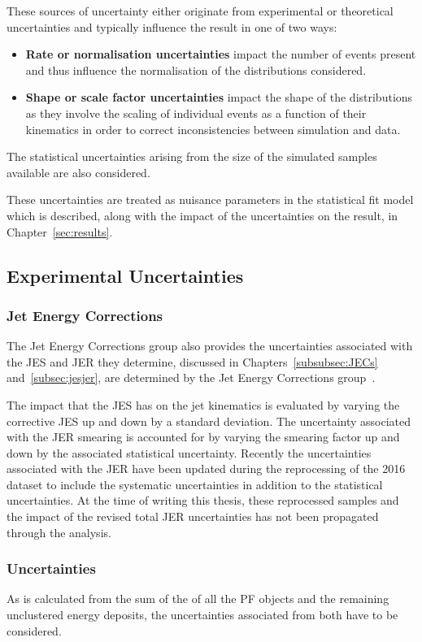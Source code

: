 These sources of uncertainty either originate from experimental or theoretical uncertainties and typically influence the result in one of two ways:
\begin{itemize}
\item \textbf{Rate or normalisation uncertainties} impact the number of events present and thus influence the  normalisation of the distributions considered.
\item \textbf{Shape or scale factor uncertainties} impact the shape of the distributions as they involve the scaling of individual events as a function of their kinematics in order to correct inconsistencies between simulation and data.
\end{itemize}

The statistical uncertainties arising from the size of the simulated samples available are also considered.

These uncertainties are treated as nuisance parameters in the statistical fit model which is described, along with the impact of the uncertainties on the result, in Chapter~\ref{sec:results}.

\subsection{Experimental Uncertainties}
\subsubsection{Jet Energy Corrections}
The Jet Energy Corrections group also provides the uncertainties associated with the JES and JER they determine, discussed in Chapters~\ref{subsubsec:JECs} and~\ref{subsec:jesjer}, are determined by the Jet Energy Corrections group~\cite{Khachatryan:2016kdb}. 

The impact that the JES has on the jet kinematics is evaluated by varying the corrective JES up and down by a standard deviation.
The uncertainty associated with the JER smearing is accounted for by varying the smearing factor up and down by the associated statistical uncertainty.
Recently the uncertainties associated with the JER have been updated during the reprocessing of the 2016 dataset to include the systematic uncertainties in addition to the statistical uncertainties.
At the time of writing this thesis, these reprocessed samples and the impact of the revised total JER uncertainties has not been propagated through the analysis.

\subsubsection{\MET Uncertainties}
As \MET is calculated from the sum of the \pT of all the PF objects and the remaining unclustered energy deposits, the uncertainties associated from both have to be considered.


